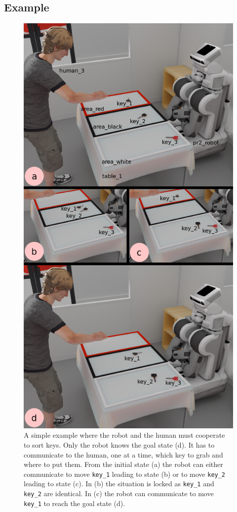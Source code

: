 \documentclass[a4paper,11pt,twoside]{StyleThese}
\begin{document}
\subsection{Example}
\begin{figure}[hbtp]
\centering
\includegraphics[scale=0.27]{figures/chapter3/Chap3illustrative.png}
\caption{A simple example where the robot and the human must cooperate to sort keys. Only the robot knows the goal state (d). It has to communicate to the human, one at a time, which key to grab and where to put them.  From the initial state (a) the robot can either communicate to move \texttt{key\_1} leading to state (b) or to move \texttt{key\_2} leading to state (c). In (b) the situation is locked as \texttt{key\_1} and \texttt{key\_2} are identical. In (c) the robot can communicate to move \texttt{key\_1} to reach the goal state (d).}
\label{fig:chap3keys}
\end{figure}
\end{document}
